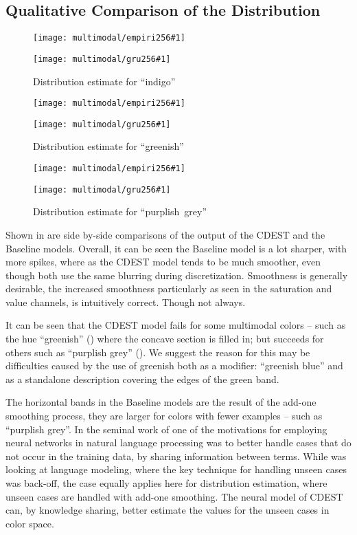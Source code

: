 \documentclass[11pt,letterpaper]{article}
\newcommand{\textcite}{\newcite}
\begin{document}
\subsection{Qualitative Comparison of the Distribution}\label{resultsdistributions}

\newcommand{\multimodalfig}[2]{
	\begin{figure}
		\texttt{[image: multimodal/empiri256\#1]}
		
		\vspace{3mm}
		
		\texttt{[image: multimodal/gru256\#1]}	
		\caption{\label{fig#1} Distribution estimate for \mbox{``#2''}}
	\end{figure}
}

\multimodalfig{indigo}{indigo}
\multimodalfig{greenish}{greenish}
\multimodalfig{purplishgrey}{purplish grey}



Shown in  are side by-side comparisons of the output of the CDEST and the Baseline models.
Overall, it can be seen the Baseline model is a lot sharper, with more spikes,
where as the CDEST model tends to be much smoother, even though both use the same blurring during discretization.
Smoothness is generally desirable, the increased smoothness particularly as seen in the saturation and value channels, is intuitively correct.
Though not always.

It can be seen that the CDEST model fails for some multimodal colors -- such as the hue ``greenish'' () where the concave section is filled in;
but succeeds for others such as ``purplish grey'' ().
We suggest the reason for this may be difficulties caused by the use of greenish both as a modifier: ``greenish blue'' and as a standalone description covering the edges of the green band.

The horizontal bands in the Baseline models are the result of the add-one smoothing process, they are larger for colors with fewer examples -- such as ``purplish grey''.
In the seminal work of \textcite{NPLM} one of the motivations for employing neural networks in natural language processing was to better handle cases that do not occur in the training data, by sharing information between terms.
While \textcite{NPLM} was looking at language modeling, where the key technique for handling unseen cases was back-off, the case equally applies here for distribution estimation, where unseen cases are handled with add-one smoothing.
The neural model of CDEST can, by knowledge sharing, better estimate the values for the unseen cases in color space.
 
\end{document}
